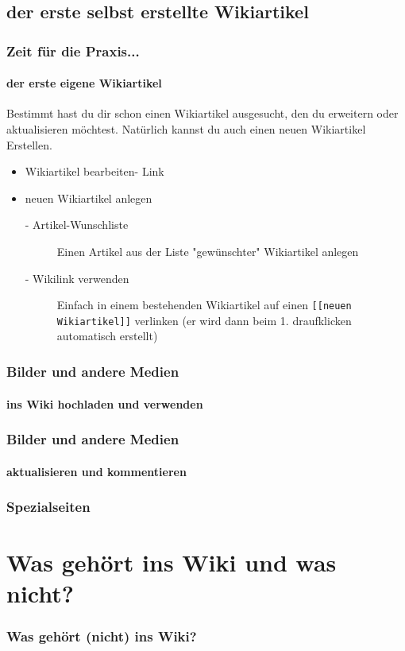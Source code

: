 \documentclass[handout]{beamer}   %
\begin{document}
\subsection{der erste selbst erstellte Wikiartikel}

\begin{frame}
  \frametitle{Zeit für die Praxis...}
  \framesubtitle{der erste eigene Wikiartikel}

  Bestimmt hast du dir schon einen Wikiartikel ausgesucht, den du erweitern oder aktualisieren möchtest. Natürlich kannst du auch einen neuen Wikiartikel Erstellen.
  
  \begin{itemize}
    \item Wikiartikel bearbeiten- Link
    \item neuen Wikiartikel anlegen
    \begin{description}
      \item[- Artikel-Wunschliste] Einen Artikel aus der Liste "gewünschter" Wikiartikel anlegen
      \item[- Wikilink verwenden] Einfach in einem bestehenden Wikiartikel auf einen \texttt{[[neuen Wikiartikel]]} verlinken (er wird dann beim 1. draufklicken automatisch erstellt)
    \end{description}
  \end{itemize}

\end{frame}

\begin{frame}
  \frametitle{Bilder und andere Medien}
  \framesubtitle{ins Wiki hochladen und verwenden}

\end{frame}


\begin{frame}
  \frametitle{Bilder und andere Medien}
  \framesubtitle{aktualisieren und kommentieren}

\end{frame}


\begin{frame}
  \frametitle{Spezialseiten}

\end{frame}

\section{Was gehört ins Wiki und was nicht?}

\begin{frame}
  \frametitle{Was gehört (nicht) ins Wiki?}

\end{frame}
\end{document}
